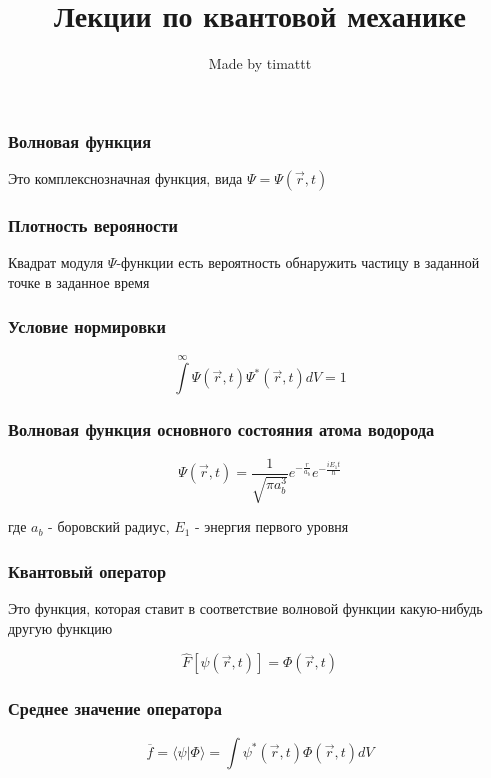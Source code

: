 \documentclass[a4paper,12pt]{article}
\author{Made by timattt}
\title{Лекции по квантовой механике}
\begin{document}

\maketitle
\newpage

\subsubsection*{Волновая функция} Это комплекснозначная функция, вида $ \Psi = \Psi(\vec r, t) $

\subsubsection*{Плотность верояности}

Квадрат модуля $\Psi$-функции есть вероятность обнаружить частицу в заданной точке в заданное время

\subsubsection*{Условие нормировки}

\[
\int\limits^{\infty} \Psi(\vec r, t) \Psi^*(\vec r, t) dV = 1
\]

\subsubsection*{Волновая функция основного состояния атома водорода}

\[
\Psi(\vec r, t) = \frac{1}{\sqrt{\pi a_b^3}} e^{-\frac{r}{a_b}}
e^{-\frac{i E_1 t}{\hbar}  }
\]

где $a_b$ - боровский радиус, $E_1$ - энергия первого уровня

\subsubsection*{Квантовый оператор}
Это функция, которая ставит в соответствие волновой функции какую-нибудь другую функцию

\[
\widehat{F} [\psi(\vec r, t)] = \Phi(\vec r, t)
\]

\subsubsection*{Среднее значение оператора}

\[
\overline{f} = \langle \psi | \Phi \rangle = \int \psi^*(\vec r, t) \Phi(\vec r, t) dV
\]
\end{document}
